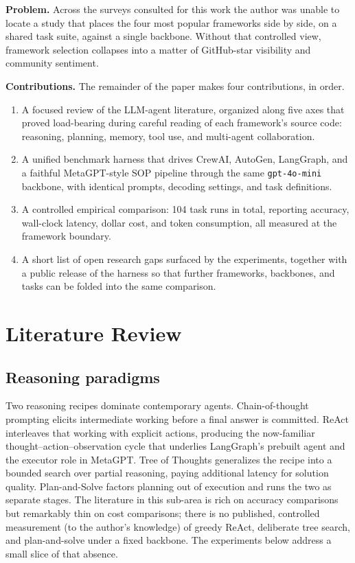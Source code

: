 \documentclass[conference]{IEEEtran}
\begin{document}
\textbf{Problem.} Across the surveys consulted for this work
\cite{wang2024agentsurvey, xi2025potential, abouali2025agentic,
li2025paradigms, guo2024multiagent} the author was unable to locate a
study that places the four most popular frameworks side by side, on a
shared task suite, against a single backbone. Without that controlled
view, framework selection collapses into a matter of GitHub-star
visibility and community sentiment.

\textbf{Contributions.} The remainder of the paper makes four
contributions, in order.
\begin{enumerate}[leftmargin=*]
\item A focused review of the LLM-agent literature, organized along
five axes that proved load-bearing during careful reading of each
framework's source code: reasoning, planning, memory, tool use, and
multi-agent collaboration.
\item A unified benchmark harness that drives CrewAI, AutoGen,
LangGraph, and a faithful MetaGPT-style SOP pipeline through the same
\texttt{gpt-4o-mini} backbone, with identical prompts, decoding
settings, and task definitions.
\item A controlled empirical comparison: 104 task runs in total,
reporting accuracy, wall-clock latency, dollar cost, and token
consumption, all measured at the framework boundary.
\item A short list of open research gaps surfaced by the experiments,
together with a public release of the harness so that further
frameworks, backbones, and tasks can be folded into the same
comparison.
\end{enumerate}

\section{Literature Review}

\subsection{Reasoning paradigms}
Two reasoning recipes dominate contemporary agents. Chain-of-thought
prompting elicits intermediate working before a final answer is
committed. ReAct \cite{yao2023react} interleaves that working with
explicit actions, producing the now-familiar
thought--action--observation cycle that underlies LangGraph's prebuilt
agent and the executor role in MetaGPT. Tree of Thoughts
\cite{yao2024tot} generalizes the recipe into a bounded search over
partial reasoning, paying additional latency for solution quality.
Plan-and-Solve \cite{wang2023planandsolve} factors planning out of
execution and runs the two as separate stages. The literature in this
sub-area is rich on accuracy comparisons but remarkably thin on cost
comparisons; there is no published, controlled measurement (to the
author's knowledge) of greedy ReAct, deliberate tree search, and
plan-and-solve under a fixed backbone. The experiments below address a
small slice of that absence.
\end{document}
